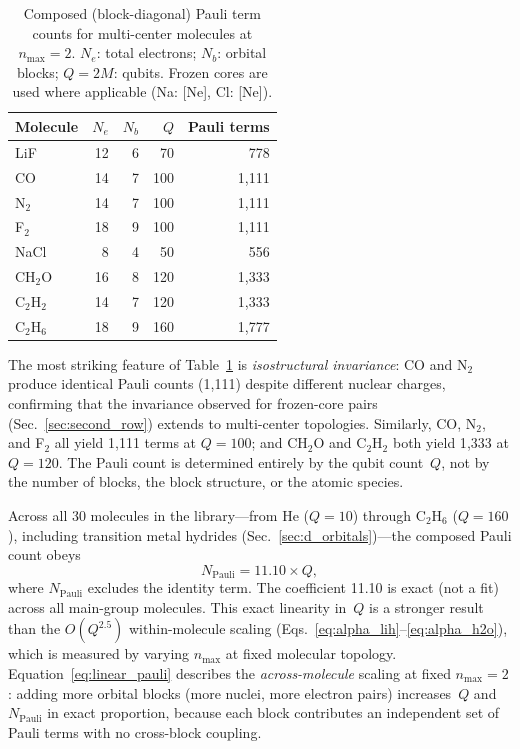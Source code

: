 \documentclass[aps,pra,twocolumn,superscriptaddress,longbibliography]{revtex4-2}
\begin{document}
\begin{table}[t]
\caption{Composed (block-diagonal) Pauli term counts for multi-center
  molecules at $n_{\max} = 2$.  $N_e$: total electrons;
  $N_b$: orbital blocks; $Q = 2M$: qubits.  Frozen cores are used
  where applicable (Na: [Ne], Cl: [Ne]).}
\label{tab:multi_center}
\begin{ruledtabular}
\begin{tabular}{lrrrr}
Molecule & $N_e$ & $N_b$ & $Q$ & Pauli terms \\
\hline
LiF      & 12 & 6 &  70 &     778 \\
CO       & 14 & 7 & 100 &   1{,}111 \\
N$_2$    & 14 & 7 & 100 &   1{,}111 \\
F$_2$    & 18 & 9 & 100 &   1{,}111 \\
NaCl     &  8 & 4 &  50 &     556 \\
CH$_2$O  & 16 & 8 & 120 &   1{,}333 \\
C$_2$H$_2$ & 14 & 7 & 120 & 1{,}333 \\
C$_2$H$_6$ & 18 & 9 & 160 & 1{,}777 \\
\end{tabular}
\end{ruledtabular}
\end{table}

The most striking feature of Table~\ref{tab:multi_center} is
\emph{isostructural invariance}: CO and N$_2$ produce identical
Pauli counts (1{,}111) despite different nuclear charges, confirming
that the invariance observed for frozen-core pairs
(Sec.~\ref{sec:second_row}) extends to multi-center topologies.
Similarly, CO, N$_2$, and F$_2$ all yield 1{,}111 terms at
$Q = 100$; and CH$_2$O and C$_2$H$_2$ both yield 1{,}333 at
$Q = 120$.  The Pauli count is determined entirely by the qubit
count~$Q$, not by the number of blocks, the block structure, or the
atomic species.

Across all 30 molecules in the library---from He ($Q = 10$) through
C$_2$H$_6$ ($Q = 160$), including transition metal hydrides
(Sec.~\ref{sec:d_orbitals})---the composed Pauli count obeys
\begin{equation}
  N_{\mathrm{Pauli}} = 11.10 \times Q,
  \label{eq:linear_pauli}
\end{equation}
where $N_{\mathrm{Pauli}}$ excludes the identity term.
The coefficient 11.10 is exact (not a fit) across all main-group molecules.  This exact linearity in~$Q$
is a stronger result than the $O(Q^{2.5})$ within-molecule scaling
(Eqs.~\ref{eq:alpha_lih}--\ref{eq:alpha_h2o}), which is measured by
varying $n_{\max}$ at fixed molecular topology.
Equation~\eqref{eq:linear_pauli} describes the \emph{across-molecule}
scaling at fixed $n_{\max} = 2$: adding more orbital blocks (more
nuclei, more electron pairs) increases~$Q$ and~$N_{\mathrm{Pauli}}$
in exact proportion, because each block contributes an independent
set of Pauli terms with no cross-block coupling.
\end{document}
